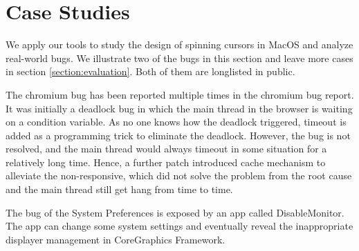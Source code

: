 \section{Case Studies} \label{sec:casestudy}
We apply our tools to study the design of spinning cursors in MacOS and analyze real-world bugs.
We illustrate two of the bugs in this section and leave more cases in section \ref{section:evaluation}.
Both of them are longlisted in public.

The chromium bug has been reported multiple times in the chromium bug report.
It was initially a deadlock bug in which the main thread in the browser is waiting on a condition variable.
As no one knows how the deadlock triggered, timeout is added as a programming trick to eliminate the deadlock.
However, the bug is not resolved, and the main thread would always timeout in some situation for a relatively long time.
Hence, a further patch introduced cache mechanism to alleviate the non-responsive, which did not solve the problem from the root cause and the main thread still get hang from time to time.

The bug of the System Preferences is exposed by an app called DisableMonitor.
The app can change some system settings and eventually reveal the inappropriate displayer management in CoreGraphics Framework.




